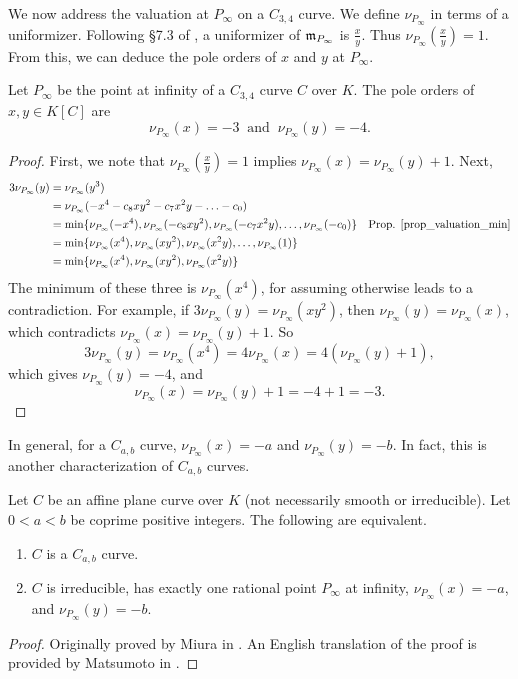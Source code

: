 We now address the valuation at $P_\infty$ on a $C_{3,4}$ curve.
We define $\nu_{P_\infty}$ in terms of a uniformizer.
Following \S 7.3 of \cite{galbraith12}, a uniformizer of $\frak m_{P_\infty}$ is $\frac x y$.
Thus $\nu_{P_\infty}\left(\frac x y\right) = 1$.
From this, we can deduce the pole orders of $x$ and $y$ at $P_\infty$.
\begin{proposition}
  \label{prop_pole_order_x_y}
  Let $P_\infty$ be the point at infinity of a $C_{3,4}$ curve $C$ over $K$.
  The pole orders of $x,y\in K[C]$ are
  \[ \nu_{P_\infty}(x) = -3 ~\text{ and }~ \nu_{P_\infty}(y) = -4. \]
\end{proposition}
\begin{proof}
  First, we note that $\nu_{P_\infty}\left(\frac x y\right) = 1$ implies $\nu_{P_\infty}(x) = \nu_{P_\infty}(y) + 1$.
  Next,
  \begin{align*}
    3\nu_{P_\infty}(y)
      &= \nu_{P_\infty}(y^3) \\
      &= \nu_{P_\infty}(-x^4 - c_8xy^2 - c_7x^2y - \ldots - c_0) \\
      &= \min\{\nu_{P_\infty}(-x^4), \nu_{P_\infty}(- c_8xy^2), \nu_{P_\infty}(-c_7x^2y), \ldots, \nu_{P_\infty}(-c_0)\}
        & \text{Prop. \ref{prop_valuation_min}} \\
      &= \min\{\nu_{P_\infty}(x^4), \nu_{P_\infty}(xy^2), \nu_{P_\infty}(x^2y), \ldots, \nu_{P_\infty}(1)\} \\
      &= \min\{\nu_{P_\infty}(x^4), \nu_{P_\infty}(xy^2), \nu_{P_\infty}(x^2y)\}
  \end{align*}
  The minimum of these three is $\nu_{P_\infty}(x^4)$, for assuming otherwise leads to a contradiction.
  For example, if $3\nu_{P_\infty}(y) = \nu_{P_\infty}(xy^2)$, then $\nu_{P_\infty}(y) = \nu_{P_\infty}(x)$,
  which contradicts $\nu_{P_\infty}(x) = \nu_{P_\infty}(y) + 1$. So
  \[ 3\nu_{P_\infty}(y) = \nu_{P_\infty}(x^4) = 4\nu_{P_\infty}(x)
     = 4(\nu_{P_\infty}(y) + 1), \]
  which gives $\nu_{P_\infty}(y) = -4$, and
  \[ \nu_{P_\infty}(x) = \nu_{P_\infty}(y) + 1 = -4 + 1 = -3. \]
\end{proof}

In general, for a $C_{a,b}$ curve, $\nu_{P_\infty}(x) = -a$ and $\nu_{P_\infty}(y) = -b$.
In fact, this is another characterization of $C_{a,b}$ curves.
\begin{theorem}
  Let $C$ be an affine plane curve over $K$ (not necessarily smooth or irreducible).
  Let $0 < a < b$ be coprime positive integers.
  The following are equivalent.
  \begin{enumerate}[label=(\roman*)]
    \item $C$ is a $C_{a,b}$ curve.
    \item $C$ is irreducible, has exactly one rational point $P_\infty$ at infinity,
          $\nu_{P_\infty}(x) = -a$, and
          $\nu_{P_\infty}(y) = -b$.
  \end{enumerate}
\end{theorem}
\begin{proof}
  Originally proved by Miura in \cite{miura97}.
  An English translation of the proof is provided by Matsumoto in \cite{matsumoto98}.
\end{proof}



